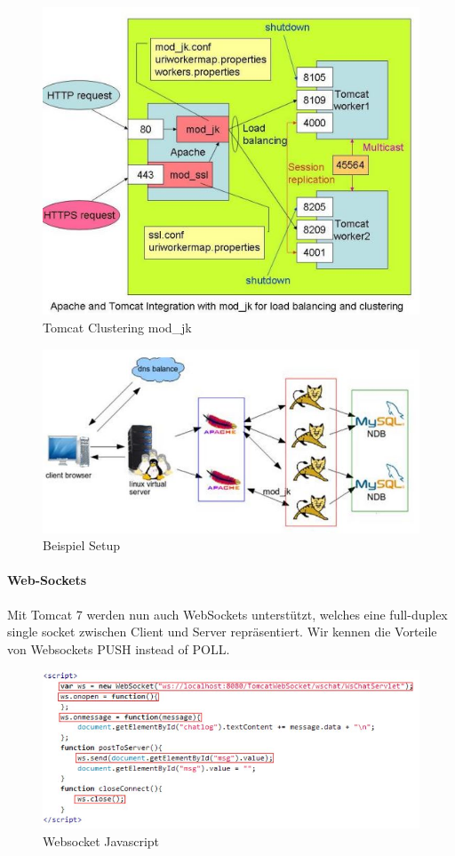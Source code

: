 \newpage
\begin{figure}[h!]
\centering
\includegraphics[width=0.7\linewidth]{fig/java-tomcat-mod-jk}
\caption{Tomcat Clustering mod\_jk}
\label{fig:java-tomcat-mod-jk}
\end{figure}

\begin{figure}[h!]
\centering
\includegraphics[width=0.7\linewidth]{fig/java-infra}
\caption{Beispiel Setup}
\label{fig:java-infra}
\end{figure}

\newpage
\paragraph{Web-Sockets}
Mit Tomcat 7 werden nun auch WebSockets unterstützt, welches eine full-duplex single socket zwischen Client und Server repräsentiert. Wir kennen die Vorteile von Websockets PUSH instead of POLL.

\begin{figure}[h!]
\centering
\includegraphics[width=0.7\linewidth]{fig/java-websocket-js}
\caption{Websocket Javascript}
\label{fig:java-websocket-js}
\end{figure}

